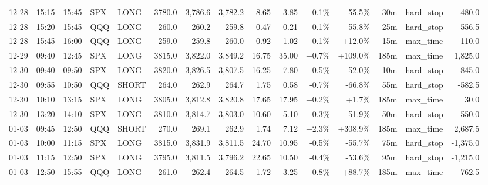 \documentclass[11pt,a4paper,twoside]{article}
\begin{document}
\begin{landscape}
\begin{center}
\begin{longtable}{>{\color{txtmain}}l l l l l r r r r r r r r >{\color{txtmain}}l r}
12-28 & 15:15 & 15:45 & SPX & LONG & 3780.0 & 3,786.6 & 3,782.2 & 8.65 & 3.85 & \textcolor{lossred}{-0.1\%} & \textcolor{lossred}{-55.5\%} & 30m & hard\_stop & \textcolor{lossred}{-480.0} \\
12-28 & 15:20 & 15:45 & QQQ & LONG & 260.0 & 260.2 & 259.8 & 0.47 & 0.21 & \textcolor{lossred}{-0.1\%} & \textcolor{lossred}{-55.8\%} & 25m & hard\_stop & \textcolor{lossred}{-556.5} \\
12-28 & 15:45 & 16:00 & QQQ & LONG & 259.0 & 259.8 & 260.0 & 0.92 & 1.02 & \textcolor{wingreen}{+0.1\%} & \textcolor{wingreen}{+12.0\%} & 15m & max\_time & \textcolor{wingreen}{110.0} \\
12-29 & 09:40 & 12:45 & SPX & LONG & 3815.0 & 3,822.0 & 3,849.2 & 16.75 & 35.00 & \textcolor{wingreen}{+0.7\%} & \textcolor{wingreen}{+109.0\%} & 185m & max\_time & \textcolor{wingreen}{1,825.0} \\
12-30 & 09:40 & 09:50 & SPX & LONG & 3820.0 & 3,826.5 & 3,807.5 & 16.25 & 7.80 & \textcolor{lossred}{-0.5\%} & \textcolor{lossred}{-52.0\%} & 10m & hard\_stop & \textcolor{lossred}{-845.0} \\
12-30 & 09:55 & 10:50 & QQQ & SHORT & 264.0 & 262.9 & 264.7 & 1.75 & 0.58 & \textcolor{lossred}{-0.7\%} & \textcolor{lossred}{-66.8\%} & 55m & hard\_stop & \textcolor{lossred}{-582.5} \\
12-30 & 10:10 & 13:15 & SPX & LONG & 3805.0 & 3,812.8 & 3,820.8 & 17.65 & 17.95 & \textcolor{wingreen}{+0.2\%} & \textcolor{wingreen}{+1.7\%} & 185m & max\_time & \textcolor{wingreen}{30.0} \\
12-30 & 13:20 & 14:10 & SPX & LONG & 3810.0 & 3,814.7 & 3,803.0 & 10.60 & 5.10 & \textcolor{lossred}{-0.3\%} & \textcolor{lossred}{-51.9\%} & 50m & hard\_stop & \textcolor{lossred}{-550.0} \\
01-03 & 09:45 & 12:50 & QQQ & SHORT & 270.0 & 269.1 & 262.9 & 1.74 & 7.12 & \textcolor{wingreen}{+2.3\%} & \textcolor{wingreen}{+308.9\%} & 185m & max\_time & \textcolor{wingreen}{2,687.5} \\
01-03 & 10:00 & 11:15 & SPX & LONG & 3815.0 & 3,831.9 & 3,811.5 & 24.70 & 10.95 & \textcolor{lossred}{-0.5\%} & \textcolor{lossred}{-55.7\%} & 75m & hard\_stop & \textcolor{lossred}{-1,375.0} \\
01-03 & 11:15 & 12:50 & SPX & LONG & 3795.0 & 3,811.5 & 3,796.2 & 22.65 & 10.50 & \textcolor{lossred}{-0.4\%} & \textcolor{lossred}{-53.6\%} & 95m & hard\_stop & \textcolor{lossred}{-1,215.0} \\
01-03 & 12:50 & 15:55 & QQQ & LONG & 261.0 & 262.4 & 264.5 & 1.72 & 3.25 & \textcolor{wingreen}{+0.8\%} & \textcolor{wingreen}{+88.7\%} & 185m & max\_time & \textcolor{wingreen}{762.5} \\

\end{longtable}
\end{center}
\end{landscape}
\end{document}
